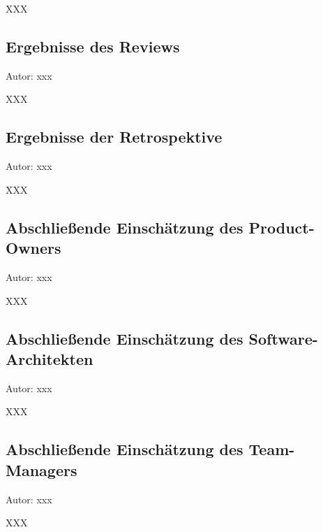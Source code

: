 XXX

\subsection{Ergebnisse des Reviews}
{\small Autor: xxx}

XXX

\subsection{Ergebnisse der Retrospektive}
{\small Autor: xxx}

XXX

\subsection{Abschließende Einschätzung des Product-Owners}
{\small Autor: xxx}

XXX

\subsection{Abschließende Einschätzung des Software-Architekten}
{\small Autor: xxx}

XXX

\subsection{Abschließende Einschätzung des Team-Managers}
{\small Autor: xxx}

XXX

